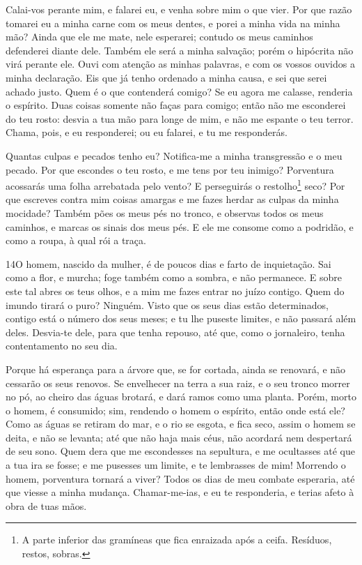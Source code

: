Calai-vos perante mim, e falarei eu, e venha sobre mim o que
vier. Por que razão tomarei eu a minha carne com os meus
dentes, e porei a minha vida na minha mão? Ainda que ele me
mate, nele esperarei; contudo os meus caminhos defenderei diante
dele. Também ele será a minha salvação; porém o hipócrita não
virá perante ele. Ouvi com atenção as minhas palavras, e com
os vossos ouvidos a minha declaração. Eis que já tenho
ordenado a minha causa, e sei que serei achado justo. Quem é
o que contenderá comigo? Se eu agora me calasse, renderia o
espírito. Duas coisas somente não faças para comigo; então
não me esconderei do teu rosto: desvia a tua mão para longe
de mim, e não me espante o teu terror. Chama, pois, e eu
responderei; ou eu falarei, e tu me responderás.

Quantas culpas e pecados tenho eu? Notifica-me a minha
transgressão e o meu pecado. Por que escondes o teu rosto, e
me tens por teu inimigo? Porventura acossarás uma folha
arrebatada pelo vento? E perseguirás o restolho\footnote{A parte
inferior das gramíneas que fica enraizada após a ceifa. Resíduos,
restos, sobras.} seco? Por que escreves contra mim coisas
amargas e me fazes herdar as culpas da minha mocidade? Também
pões os meus pés no tronco, e observas todos os meus caminhos, e
marcas os sinais dos meus pés. E ele me consome como a
podridão, e como a roupa, à qual rói a traça.

\medskip

\lettrine{14} O homem, nascido da mulher, é de poucos dias e
farto de inquietação. Sai como a flor, e murcha; foge também
como a sombra, e não permanece. E sobre este tal abres os teus
olhos, e a mim me fazes entrar no juízo contigo. Quem do imundo
tirará o puro? Ninguém. Visto que os seus dias estão
determinados, contigo está o número dos seus meses; e tu lhe puseste
limites, e não passará além deles. Desvia-te dele, para que
tenha repouso, até que, como o jornaleiro, tenha contentamento no
seu dia.

Porque há esperança para a árvore que, se for cortada, ainda se
renovará, e não cessarão os seus renovos. Se envelhecer na terra
a sua raiz, e o seu tronco morrer no pó, ao cheiro das águas
brotará, e dará ramos como uma planta. Porém, morto o homem,
é consumido; sim, rendendo o homem o espírito, então onde está ele?
Como as águas se retiram do mar, e o rio se esgota, e fica
seco, assim o homem se deita, e não se levanta; até que não
haja mais céus, não acordará nem despertará de seu sono. Quem
dera que me escondesses na sepultura, e me ocultasses até que a tua
ira se fosse; e me pusesses um limite, e te lembrasses de mim!
Morrendo o homem, porventura tornará a viver? Todos os dias
de meu combate esperaria, até que viesse a minha mudança.
Chamar-me-ias, e eu te responderia, e terias afeto à obra de
tuas mãos.

